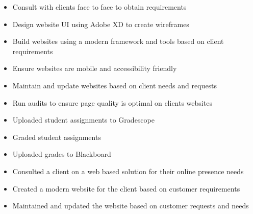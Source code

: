 \documentclass[10pt,a4paper,ragged2e,withhyper]{altacv}
\begin{document}

    \makecvheader


    \begin{paracol}{2}


      \begin{itemize}
          \item Consult with clients face to face to obtain requirements
          \item Design website UI using Adobe XD to create wireframes
          \item Build websites using a modern framework and tools based on client requirements 
          \item Ensure websites are mobile and accessibility friendly
          \item Maintain and update websites based on client needs and requests
          \item Run audits to ensure page quality is optimal on clients websites
      \end{itemize}

      \begin{itemize}
          \item Uploaded student assignments to Gradescope
          \item Graded student assignments 
          \item Uploaded grades to Blackboard
      \end{itemize}

      \begin{itemize}
          \item Consulted a client on a web based solution for their online presence needs
          \item Created a modern website for the client based on customer requirements 
          \item Maintained and updated the website based on customer requests and needs
      \end{itemize}
      

\end{paracol}
\end{document}
